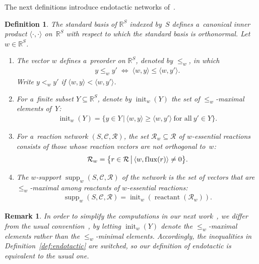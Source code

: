 \documentclass[pdftex]{sigma}
\newtheorem{Definition}[Theorem]{Definition}
\newtheorem{Remark}[Theorem]{Remark}
\newcommand{\source}[1]{\operatorname{reactant}(#1)}
\newcommand{\flux}[1]{\operatorname{f\/lux}(#1)} %
\newcommand{\init}[2]{\operatorname{init}_{#1}\left(#2\right)}
\newcommand{\supp}[2]{\operatorname{supp}_{#1}\left(#2\right)}
\renewcommand\iff{\Leftrightarrow}
\begin{document}
The next def\/initions introduce endotactic networks of~\cite{CNP}.
\begin{Definition}\label{def:partialOrder}
The standard basis of $\mathbb{R}^S$ indexed by~$S$ def\/ines a~canonical inner product $\langle\cdot,\cdot\rangle$ on~$\mathbb{R}^S$ with respect to which the standard basis is orthonormal.
Let $w\in\mathbb{R}^S$.
\begin{enumerate}\itemsep=0pt
\item The vector $w$ def\/ines a~preorder on $\mathbb{R}^S$, denoted by $\leq_w$, in which
\begin{gather*}
y\leq_w y'\;\iff\;\langle w,y\rangle\leq\langle w,y'\rangle.
\end{gather*}
Write $y<_w y'$ if $\langle w,y\rangle<\langle w,y'\rangle$.
\item For a~f\/inite subset $Y\subseteq\mathbb{R}^S$, denote by $\init wY$ the set of $\leq_w$-maximal elements of~$Y$:
\begin{gather*}
\init wY=\big\{y\in Y\,\big|\, \langle w,y\rangle\geq\langle w,y'\rangle~\text{for all}~y'\in Y\big\}.
\end{gather*}
\item For a~reaction network $(S,\mathcal C,\mathcal R)$, the set $\mathcal R_w\subseteq\mathcal R$ of
$w$-\emph{essential reactions} consists of those whose reaction vectors are not orthogonal to~$w$:
\begin{gather*}
\mathcal R_w=\big\{r\in\mathcal R\,\big|\,\langle w,\flux{r}\rangle\neq0\big\}.
\end{gather*}
\item The $w$-\emph{support} $\supp w{S,\mathcal C,\mathcal R}$ of the network is the set of vectors that are
$\leq_w$-maximal among reactants of $w$-essential reactions:
\begin{gather*}
\supp w{S,\mathcal C,\mathcal R}=\init w{\source{\mathcal R_w}}.
\end{gather*}
\end{enumerate}
\end{Definition}
\begin{Remark}
In order to simplify the computations in our next work~\cite{GeoGAC}, we dif\/fer from the usual
convention~\cite{CNP,Pantea}, by letting $\init wY$ denote the $\leq_w$-maximal elements rather than the
$\leq_w$-minimal elements.
Accordingly, the inequalities in Def\/inition~\ref{def:endotactic} are switched, so our def\/inition of endotactic is
equivalent to the usual one.
\end{Remark}
\end{document}

